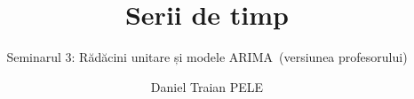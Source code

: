 \title[Serii de timp]{Serii de timp}
\subtitle{Seminarul 3: Rădăcini unitare și modele ARIMA\ifsolutions\ (versiunea profesorului)\fi}
\author[D.T. Pele]{Daniel Traian PELE}
\date{}

\providecommand{\tsaapplink}[3]{\hypertarget{#2}{}\hyperlink{#1}{\beamergotobutton{#3}}}  %
\providecommand{\tsaappback}[2]{\begin{tikzpicture}[remember picture,overlay]\node[anchor=south east] at ([xshift=-3mm,yshift=7mm]current page.south east){\hyperlink{#1}{\beamerreturnbutton{#2}}};\end{tikzpicture}}  %
\providecommand{\tsachlink}[2]{\href{#1}{#2}}  %
\providecommand{\tsachlinkt}[2]{\href{#1}{\usebeamercolor[fg]{frametitle}#2}}  %


